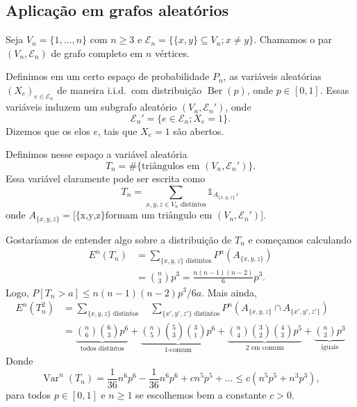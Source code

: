 \documentclass[reqno, final]{book}
\newcommand*\1{\mathds{1}}
\DeclareMathOperator{\Var}{Var}
\DeclareMathOperator{\Ber}{Ber}
\def \iid{i.i.d.~}
\begin{document}
\subsection{Aplicação em grafos aleatórios}

Seja $V_n = \{1, \dots, n\}$ com $n \geq 3$ e $\mathcal{E}_n = \big\{ \{x,y\} \subseteq V_n; x \neq y \big\}$.
Chamamos o par $(V_n, \mathcal{E}_n)$ de grafo completo em $n$ vértices.

Definimos em um certo espaço de probabilidade $P_n$, as variáveis aleatórias $(X_e)_{e \in \mathcal{E}_n}$ de maneira \iid com distribuição $\Ber(p)$, onde $p \in [0,1]$.
Essas variáveis induzem um subgrafo aleatório $(V_n, \mathcal{E}_n')$, onde
\begin{equation}
  \mathcal{E}_n' = \big\{ e \in \mathcal{E}_n; X_e = 1 \big\}.
\end{equation}
Dizemos que os elos $e$, tais que $X_e = 1$ são abertos.

Definimos nesse espaço a variável aleatória
\begin{equation}
  T_n = \#\big\{\text{triângulos em $(V_n, \mathcal{E}_n')$}\big\}.
\end{equation}
Essa variável claramente pode ser escrita como
\begin{equation}
  T_n = \sum_{x,y,z \in V_n \text{ distintos}} \1_{A_{\{x,y,z\}}},
\end{equation}
onde $A_{\{x,y,z\}} = \big[\text{\{x,y,z\} formam um triângulo em $(V_n, \mathcal{E}_n')$}\big]$.

Gostaríamos de entender algo sobre a distribuição de $T_n$ e começamos calculando
\begin{equation}
  \begin{split}
    E^n(T_n) & = \sum_{\{x,y,z\} \text{ distintos}} P^n(A_{\{x,y,z\}})\\
    & = \binom{n}{3} p^3 = \frac{n(n-1)(n-2)}{6}p^3.
  \end{split}
\end{equation}
Logo, $P[T_n > a] \leq n(n-1)(n-2)p^3/6a$.
Mais ainda,
\begin{equation}
  \begin{split}
    E^n(T_n^2) & = \sum_{\{x,y,z\} \text{ distintos}} \quad \sum_{\{x',y',z'\} \text{ distintos}} P^n(A_{\{x,y,z\}} \cap A_{\{x',y',z'\}})\\
    & = \underbrace{\binom{n}{6} \binom{6}{3} p^6}_{\text{todos distintos}} + \underbrace{\binom{n}{5} \binom{5}{3} \binom{3}{1} p^6}_{\text{$1$-comum}} + \underbrace{\binom{n}{4} \binom{3}{2} \binom{4}{3} p^5}_{\text{$2$ em comum}} + \underbrace{\binom{n}{3}p^3}_{\text{iguais}}
  \end{split}
\end{equation}
Donde
\begin{equation}
  \Var^n(T_n) = \frac{1}{36} n^6 p^6 - \frac{1}{36} n^6 p^6 + c n^5 p^5 + ... \leq c (n^5 p^5 + n^3 p^3),
\end{equation}
para todos $p \in [0,1]$ e $n \geq 1$ se escolhemos bem a constante $c > 0$.
\end{document}
